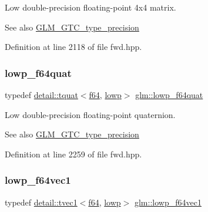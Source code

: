 Low double-\/precision floating-\/point 4x4 matrix. \begin{DoxySeeAlso}{See also}
\hyperlink{group__gtc__type__precision}{G\+L\+M\+\_\+\+G\+T\+C\+\_\+type\+\_\+precision} 
\end{DoxySeeAlso}


Definition at line 2118 of file fwd.\+hpp.

\mbox{\label{group__gtc__type__precision_ga225e6f95dd6a7049b1a86db23b90cbac}} 
\subsubsection{\texorpdfstring{lowp\+\_\+f64quat}{lowp\_f64quat}}
{\footnotesize\ttfamily typedef \hyperlink{structglm_1_1detail_1_1tquat}{detail\+::tquat}$<$\hyperlink{group__gtc__type__precision_ga2bba392e555124b36cde6abba349bab3}{f64}, \hyperlink{namespaceglm_a0f04f086094c747d227af4425893f545ae161af3fc695e696ce3bf69f7332bc2d}{lowp}$>$ \hyperlink{group__gtc__type__precision_ga225e6f95dd6a7049b1a86db23b90cbac}{glm\+::lowp\+\_\+f64quat}}

Low double-\/precision floating-\/point quaternion. \begin{DoxySeeAlso}{See also}
\hyperlink{group__gtc__type__precision}{G\+L\+M\+\_\+\+G\+T\+C\+\_\+type\+\_\+precision} 
\end{DoxySeeAlso}


Definition at line 2259 of file fwd.\+hpp.

\mbox{\label{group__gtc__type__precision_ga47d9eed23b6e3fc58676176be392293a}} 
\subsubsection{\texorpdfstring{lowp\+\_\+f64vec1}{lowp\_f64vec1}}
{\footnotesize\ttfamily typedef \hyperlink{structglm_1_1detail_1_1tvec1}{detail\+::tvec1}$<$\hyperlink{group__gtc__type__precision_ga2bba392e555124b36cde6abba349bab3}{f64}, \hyperlink{namespaceglm_a0f04f086094c747d227af4425893f545ae161af3fc695e696ce3bf69f7332bc2d}{lowp}$>$ \hyperlink{group__gtc__type__precision_ga47d9eed23b6e3fc58676176be392293a}{glm\+::lowp\+\_\+f64vec1}}

